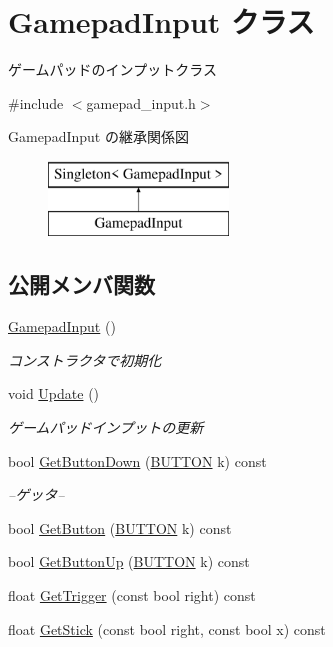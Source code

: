 \hypertarget{class_gamepad_input}{}\section{Gamepad\+Input クラス}
\label{class_gamepad_input}


ゲームパッドのインプットクラス  




{\ttfamily \#include $<$gamepad\+\_\+input.\+h$>$}

Gamepad\+Input の継承関係図\begin{figure}[H]
\begin{center}
\leavevmode
\includegraphics[height=2.000000cm]{class_gamepad_input}
\end{center}
\end{figure}
\subsection*{公開メンバ関数}
\begin{DoxyCompactItemize}
\item 
\mbox{\hyperlink{class_gamepad_input_acd9878326e438f379020827d63ebd6cf}{Gamepad\+Input}} ()
\begin{DoxyCompactList}\small\item\em コンストラクタで初期化 \end{DoxyCompactList}\item 
void \mbox{\hyperlink{class_gamepad_input_a3512c0cc4d57534c83db09c4b5377caa}{Update}} ()
\begin{DoxyCompactList}\small\item\em ゲームパッドインプットの更新 \end{DoxyCompactList}\item 
bool \mbox{\hyperlink{class_gamepad_input_a7e7a0e3d48ce3f91332fd52c4c92bb8f}{Get\+Button\+Down}} (\mbox{\hyperlink{gamepad__input_8h_a739845b0076428add52ca3cec492e705}{B\+U\+T\+T\+ON}} k) const
\begin{DoxyCompactList}\small\item\em --ゲッタ-- \end{DoxyCompactList}\item 
bool \mbox{\hyperlink{class_gamepad_input_a2bf3c765fd5e4261a0ab56c8871bd614}{Get\+Button}} (\mbox{\hyperlink{gamepad__input_8h_a739845b0076428add52ca3cec492e705}{B\+U\+T\+T\+ON}} k) const
\item 
bool \mbox{\hyperlink{class_gamepad_input_a2c013028c4e0983a957666ff9922a40c}{Get\+Button\+Up}} (\mbox{\hyperlink{gamepad__input_8h_a739845b0076428add52ca3cec492e705}{B\+U\+T\+T\+ON}} k) const
\item 
float \mbox{\hyperlink{class_gamepad_input_aab528f55fe651996096e697acdec4546}{Get\+Trigger}} (const bool right) const
\item 
float \mbox{\hyperlink{class_gamepad_input_ab7e3fb80f81fcafdfc7c0f546c280929}{Get\+Stick}} (const bool right, const bool x) const
\end{DoxyCompactItemize}
